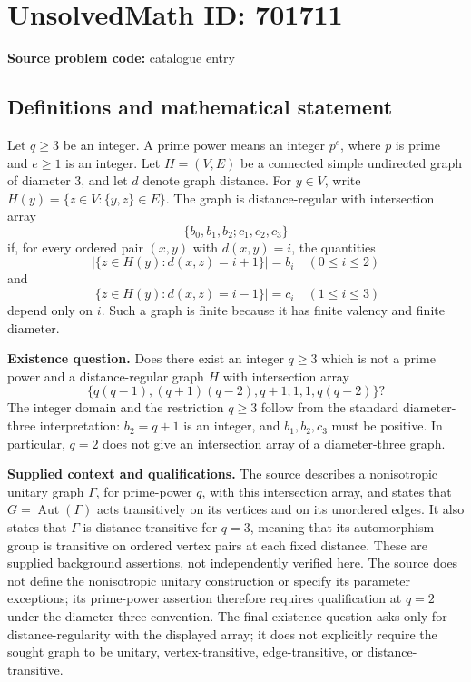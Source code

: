 \documentclass[11pt]{article}
\begin{document}
\section*{UnsolvedMath ID: 701711}
\textbf{Source problem code:} catalogue entry
\subsection{Definitions and mathematical statement}
Let \(q\geq 3\) be an integer. A prime power means an integer \(p^e\), where \(p\) is prime and \(e\geq 1\) is an integer. Let \(H=(V,E)\) be a connected simple undirected graph of diameter \(3\), and let \(d\) denote graph distance. For \(y\in V\), write \(H(y)=\{z\in V:\{y,z\}\in E\}\). The graph is distance-regular with intersection array
\[
\{b_0,b_1,b_2;c_1,c_2,c_3\}
\]
if, for every ordered pair \((x,y)\) with \(d(x,y)=i\), the quantities
\[
\left|\{z\in H(y):d(x,z)=i+1\}\right|=b_i\quad(0\leq i\leq 2)
\]
and
\[
\left|\{z\in H(y):d(x,z)=i-1\}\right|=c_i\quad(1\leq i\leq 3)
\]
depend only on \(i\). Such a graph is finite because it has finite valency and finite diameter.

\textbf{Existence question.} Does there exist an integer \(q\geq 3\) which is not a prime power and a distance-regular graph \(H\) with intersection array
\[
\{q(q-1),(q+1)(q-2),q+1;1,1,q(q-2)\}?
\]
The integer domain and the restriction \(q\geq 3\) follow from the standard diameter-three interpretation: \(b_2=q+1\) is an integer, and \(b_1,b_2,c_3\) must be positive. In particular, \(q=2\) does not give an intersection array of a diameter-three graph.

\textbf{Supplied context and qualifications.} The source describes a nonisotropic unitary graph \(\Gamma\), for prime-power \(q\), with this intersection array, and states that \(G=\operatorname{Aut}(\Gamma)\) acts transitively on its vertices and on its unordered edges. It also states that \(\Gamma\) is distance-transitive for \(q=3\), meaning that its automorphism group is transitive on ordered vertex pairs at each fixed distance. These are supplied background assertions, not independently verified here. The source does not define the nonisotropic unitary construction or specify its parameter exceptions; its prime-power assertion therefore requires qualification at \(q=2\) under the diameter-three convention. The final existence question asks only for distance-regularity with the displayed array; it does not explicitly require the sought graph to be unitary, vertex-transitive, edge-transitive, or distance-transitive.
\end{document}
